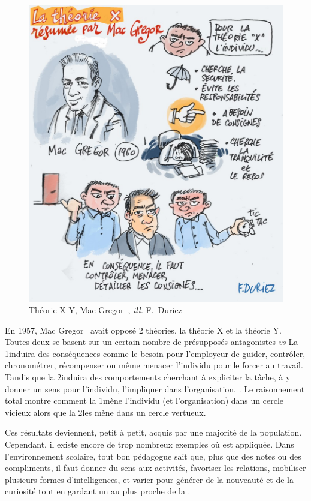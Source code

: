 \begin{figure}[!h]
\begin{minipage}{0.475\linewidth}
        \includegraphics[width=\linewidth]{Figures/Duriez-motiv4.jpg}
        \caption[Théorie X Y, Mac Gregor~]{Théorie X Y, Mac Gregor~, \textit{ill.} F.~Duriez~}
        \label{fig:motiv4}
    \end{minipage}
    \end{figure}\par%
    En 1957, Mac Gregor~ avait opposé 2 théories, la théorie X et la théorie Y. Toutes deux se basent sur un certain nombre de présupposés antagonistes \eg {} \textit{vs} 
    La 1\iere induira des conséquences comme le besoin pour l'employeur de  guider, contrôler, chronométrer, récompenser ou même menacer l'individu pour le forcer au travail. Tandis que la 2\nde induira des comportements cherchant à expliciter la tâche, à y donner un sens pour l'individu, l'impliquer dans l'organisation, \etc. 
    Le raisonnement total montre comment la 1\iere mène l'individu (et l'organisation) dans un cercle vicieux alors que la 2\nde les mène dans un cercle vertueux.\par%
    Ces résultats deviennent, petit à petit, acquis par une majorité de la population. Cependant, il existe encore de trop nombreux exemples où  est appliquée. Dans l'environnement scolaire, tout bon pédagogue sait  que, plus que des notes ou des compliments, il faut donner du sens aux activités, favoriser les relations, mobiliser plusieurs formes d'intelligences, et varier pour générer de la nouveauté et de la curiosité tout en gardant un  au plus proche de la .
